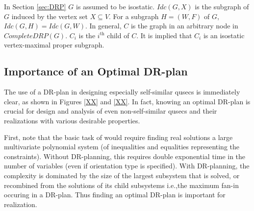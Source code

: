 




In Section \ref{sec:DRP} $G$ is assumed to be isostatic.
$Idc(G,X)$ is the subgraph of $G$ induced by the vertex set $X\subseteq V$. 
For a subgraph $H=(W,F)$ of $G$, $Idc(G,H)=Idc(G,W)$.
In general, $C$ is the graph in an arbitrary node in $CompleteDRP(G)$. $C_i$
is the $i^{\text{th}}$ child of $C$. It is implied that 
$C_i$ is an isostatic vertex-maximal proper subgraph.

\subsection{Importance of an Optimal DR-plan}
The use of a DR-plan in designing especially self-similar qusecs is
immediately clear, as shown in Figures \ref{XX} and \ref{XX}.
In fact, knowing an optimal DR-plan is crucial for design and analysis of 
even non-self-similar qusecs 
and their realizations with various desirable properties. 

First, note that the basic task of  would require finding real
 solutions 
 a large multivariate polynomial system (of inequalities and equalities
 representing the constraints). Without DR-planning, this requires double
 exponential time in the number of variables
 (even if orientation type is specified).
With DR-planning, the complexity is dominated by the size of the largest 
subsystem that is
solved, or recombined from the solutions of its child subsystems i.e.,the maximum fan-in occuring in a DR-plan.
Thus finding an optimal DR-plan is important for realization.

